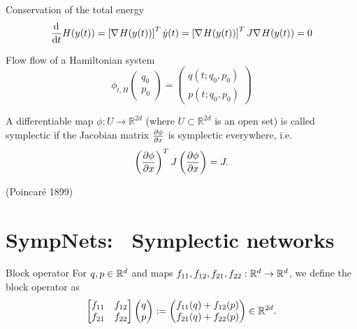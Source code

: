 \begin{frame}[c]{Conservation of the total energy}
  \centering
  \begin{equation*}
    \frac{\mathrm{d}^{}}{\mathrm{d}t} H(y(t)) = \left[ \nabla_{}{H}(y(t)) \right]^T \dot{y}(t) = 
    \left[ \nabla_{}{H}(y(t)) \right]^T J \nabla_{}{H}(y(t)) = 0
  \end{equation*}
\end{frame}

\begin{frame}{Flow}
  flow of a Hamiltonian system
  \begin{equation*}
    \phi_{t,H}\begin{pmatrix}
      q_0 \\
      p_0
    \end{pmatrix}
    = \begin{pmatrix}
      q(t; q_0, p_0) \\
      p(t; q_0, p_0)
    \end{pmatrix}
  \end{equation*}

  \begin{definition}
    A differentiable map $\phi : U \to \mathbb{R}^{2d}$ (where $U \subset \mathbb{R}^{2d}$ is an open set)
    is called symplectic if the Jacobian matrix $\frac{\partial \phi}{\partial x}$ is symplectic everywhere, i.e.
    \begin{equation*}
      \left( \frac{\partial \phi}{\partial x} \right)^T J \left( \frac{\partial \phi}{\partial x} \right) = J
      .
    \end{equation*}
  \end{definition}

   (Poincaré 1899)
\end{frame}

\section{SympNets: ~\newline Symplectic networks}

\begin{frame}[c]{Block operator}
  For $q,p \in \mathbb{R}^{d}$ and maps $f_{11}, f_{12}, f_{21}, f_{22} : \mathbb{R}^d \to \mathbb{R}^d$,
  we define the block operator as
  \begin{equation*}
    \begin{bmatrix}
      f_{11} & f_{12} \\
      f_{21} & f_{22}
    \end{bmatrix}
    \begin{pmatrix} q \\ p \end{pmatrix}
    := \begin{pmatrix}
      f_{11}(q) + f_{12}(p) \\
      f_{21}(q) + f_{22}(p)
    \end{pmatrix} \in \mathbb{R}^{2d}
    .
  \end{equation*}
\end{frame}


